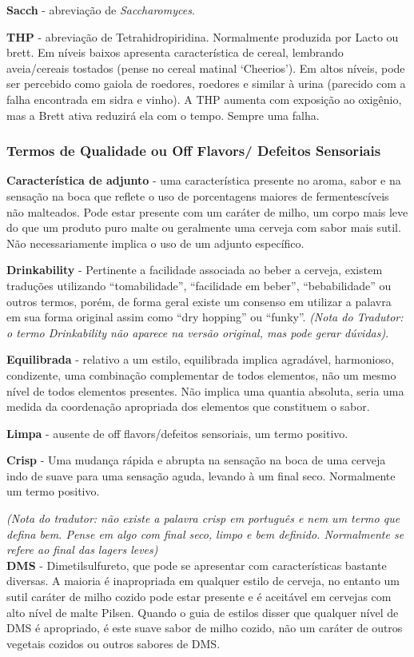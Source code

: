 \textbf{Sacch} - abreviação de \textit{Saccharomyces}.

\textbf{THP} - abreviação de Tetrahidropiridina. Normalmente produzida por Lacto ou brett. Em níveis baixos apresenta característica de cereal, lembrando aveia/cereais tostados (pense no cereal matinal ‘Cheerios’). Em altos níveis, pode ser percebido como gaiola de roedores, roedores e similar à urina (parecido com a falha encontrada em sidra e vinho). A THP aumenta com exposição ao oxigênio, mas a Brett ativa reduzirá ela com o tempo. Sempre uma falha.
\subsubsection*{Termos de Qualidade ou Off Flavors/ Defeitos Sensoriais}
\textbf{Característica de adjunto} - uma característica presente no aroma, sabor e na sensação na boca que reflete o uso de porcentagens maiores de fermentescíveis não malteados.  Pode estar presente com um caráter de milho, um corpo mais leve do que um produto puro malte ou geralmente uma cerveja com sabor mais sutil. Não necessariamente implica o uso de um adjunto específico.

\textbf{Drinkability} - Pertinente a facilidade associada ao beber a cerveja, existem traduções utilizando “tomabilidade”, “facilidade em beber”, “bebabilidade” ou outros termos, porém, de forma geral existe um consenso em utilizar a palavra em sua forma original assim como “dry hopping” ou “funky”. \textit{(Nota do Tradutor: o termo Drinkability não aparece na versão original, mas pode gerar dúvidas)}.

\textbf{Equilibrada} - relativo a um estilo, equilibrada implica agradável, harmonioso, condizente, uma combinação complementar de todos elementos, não um mesmo nível de todos elementos presentes. Não implica uma quantia absoluta, seria uma medida da coordenação apropriada dos elementos que constituem o sabor.

\textbf{Limpa} - ausente de off flavors/defeitos sensoriais, um termo positivo.

\textbf{Crisp} - Uma mudança rápida e abrupta na sensação na boca de uma cerveja indo de suave para uma sensação aguda, levando à um final seco. Normalmente um termo positivo.

\textit{(Nota do tradutor: não existe a palavra crisp em português e nem um termo que defina bem. Pense em algo com final seco, limpo e bem definido. Normalmente se refere ao final das lagers leves)}\\
\textbf{DMS} - Dimetilsulfureto, que pode se apresentar com características bastante diversas. A maioria é inapropriada em qualquer estilo de cerveja, no entanto um sutil caráter de milho cozido pode estar presente e é aceitável em cervejas com alto nível de malte Pilsen. Quando o guia de estilos disser que qualquer nível de DMS é apropriado, é este suave sabor de milho cozido, não um caráter de outros vegetais cozidos ou outros sabores de DMS.

